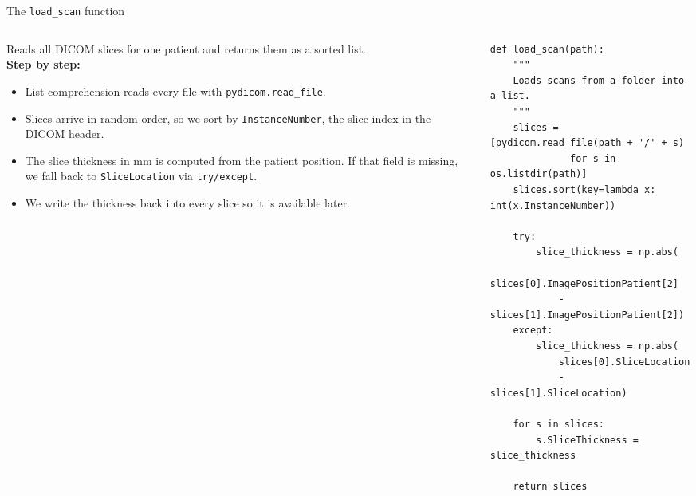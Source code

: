 \documentclass[10pt,aspectratio=169]{beamer}
\renewcommand{\section}[2][]{}
\begin{document}
\begin{frame}[fragile]{The \texttt{load\_scan} function}
\begin{columns}[T,onlytextwidth]
\begin{column}{0.42\textwidth}
\small
Reads all DICOM slices for one patient and returns them as a sorted list.\\[0.4em]
\textbf{Step by step:}
\begin{itemize}
  \item List comprehension reads every file with \texttt{pydicom.read\_file}.
  \item Slices arrive in random order, so we sort by \texttt{InstanceNumber}, the slice index in the DICOM header.
  \item The slice thickness in mm is computed from the patient position. If that field is missing, we fall back to \texttt{SliceLocation} via \texttt{try/except}.
  \item We write the thickness back into every slice so it is available later.
\end{itemize}
\end{column}
\begin{column}{0.56\textwidth}
\begin{lstlisting}[firstnumber=last]
def load_scan(path):
    """
    Loads scans from a folder into a list.
    """
    slices = [pydicom.read_file(path + '/' + s)
              for s in os.listdir(path)]
    slices.sort(key=lambda x: int(x.InstanceNumber))

    try:
        slice_thickness = np.abs(
            slices[0].ImagePositionPatient[2]
            - slices[1].ImagePositionPatient[2])
    except:
        slice_thickness = np.abs(
            slices[0].SliceLocation
            - slices[1].SliceLocation)

    for s in slices:
        s.SliceThickness = slice_thickness

    return slices
\end{lstlisting}
\end{column}
\end{columns}
\end{frame}

\section{Hounsfield Units}
\end{document}
